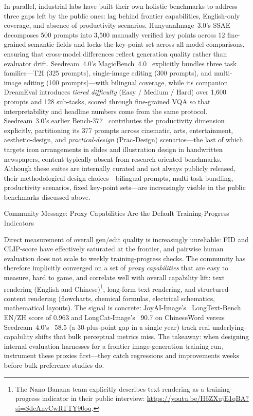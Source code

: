 \documentclass{llmxive}
\begin{document}
In parallel, industrial labs have built their own holistic benchmarks to address three gaps left by the public ones: lag behind frontier capabilities, English-only coverage, and absence of productivity scenarios. HunyuanImage~3.0's SSAE~\citep{cao2025hunyuanimage} decomposes 500 prompts into 3{,}500 manually verified key points across 12 fine-grained semantic fields and locks the key-point set across all model comparisons, ensuring that cross-model differences reflect generation quality rather than evaluator drift. Seedream~4.0's MagicBench~4.0~\citep{seedream2025seedream} explicitly bundles three task families---T2I (325 prompts), single-image editing (300 prompts), and multi-image editing (100 prompts)---with bilingual coverage, while its companion DreamEval introduces \emph{tiered difficulty} (Easy / Medium / Hard) over 1{,}600 prompts and 128 sub-tasks, scored through fine-grained VQA so that interpretability and headline numbers come from the same protocol. Seedream~3.0's earlier Bench-377~\citep{gao2025seedream} contributes the productivity dimension explicitly, partitioning its 377 prompts across cinematic, arts, entertainment, aesthetic-design, and \emph{practical-design} (Prac-Design) scenarios---the last of which targets icon arrangements in slides and illustration design in handwritten newspapers, content typically absent from research-oriented benchmarks. Although these suites are internally curated and not always publicly released, their methodological design choices---bilingual prompts, multi-task bundling, productivity scenarios, fixed key-point sets---are increasingly visible in the public benchmarks discussed above.

\begin{highlightbox}{Community Message: Proxy Capabilities Are the Default Training-Progress Indicators}

Direct measurement of overall gen/edit quality is increasingly unreliable: FID and CLIP-score have effectively saturated at the frontier, and pairwise human evaluation does not scale to weekly training-progress checks. The community has therefore implicitly converged on a set of \emph{proxy capabilities} that are easy to measure, hard to game, and correlate well with overall capability lift: text rendering (English and Chinese)\footnote{The Nano Banana team explicitly describes text rendering as a training-progress indicator in their public interview: \url{https://youtu.be/H6ZXujE1qBA?si=SdeAnvCwRTTY90oq}.}, long-form text rendering, and structured-content rendering (flowcharts, chemical formulas, electrical schematics, mathematical layouts). The signal is concrete: JoyAI-Image's~\citep{jdjoyaiimage} LongText-Bench EN/ZH score of 0.963 and LongCat-Image's~\citep{team2025longcat} 90.7 on ChineseWord versus Seedream~4.0's~\citep{seedream2025seedream} 58.5 (a 30-plus-point gap in a single year) track real underlying-capability shifts that bulk perceptual metrics miss. The takeaway: when designing internal evaluation harnesses for a frontier image-generation training run, instrument these proxies first---they catch regressions and improvements weeks before bulk preference studies do.
\end{highlightbox}
\end{document}
